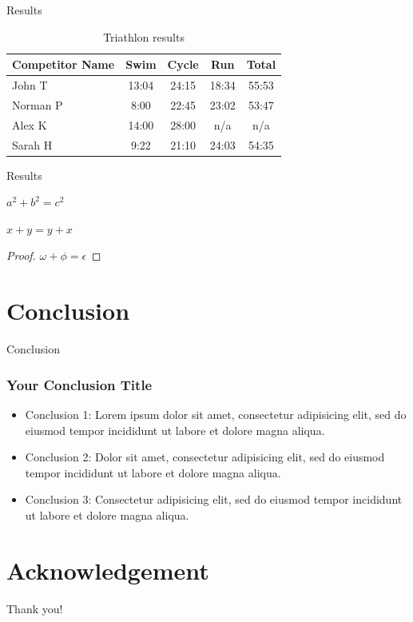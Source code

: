 \documentclass[10pt]{beamer}
\begin{document}
	\begin{frame}{Results}
		\begin{table}
			\begin{tabular}{l | c | c | c | c }
				Competitor Name & Swim  & Cycle & Run   & Total \\
				\hline \hline
				John T          & 13:04 & 24:15 & 18:34 & 55:53 \\
				Norman P        & 8:00  & 22:45 & 23:02 & 53:47 \\
				Alex K          & 14:00 & 28:00 & n/a   & n/a   \\
				Sarah H         & 9:22  & 21:10 & 24:03 & 54:35
			\end{tabular}
			\caption{Triathlon results}
			\label{tab:table}
		\end{table}
	\end{frame}

	\begin{frame}{Results}
		\begin{theorem}[Pythagoras]
			$ a^2 + b^2 = c^2$
		\end{theorem}
		\begin{corollary}
			$ x + y = y + x  $
		\end{corollary}
		\begin{proof}
			$\omega +\phi = \epsilon $
		\end{proof}
	\end{frame}


	\section{Conclusion}

	\begin{frame}{Conclusion}
		\frametitle{Your Conclusion Title}
		\begin{itemize}
			\item Conclusion 1: Lorem ipsum dolor sit amet, consectetur adipisicing elit, sed do eiusmod tempor incididunt ut labore et dolore magna aliqua.
			\item Conclusion 2: Dolor sit amet, consectetur adipisicing elit, sed do eiusmod tempor incididunt ut labore et dolore magna aliqua.
			\item Conclusion 3: Consectetur adipisicing elit, sed do eiusmod tempor incididunt ut labore et dolore magna aliqua.
		\end{itemize}
	\end{frame}


	\section*{Acknowledgement}
	\begin{frame}
		\textcolor{myNewColorA}{\Huge{\centerline{Thank you!}}}
	\end{frame}
\end{document}
